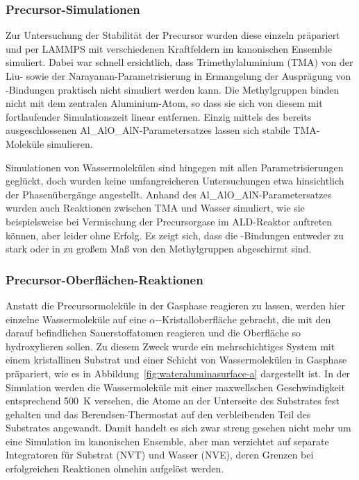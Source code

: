 \subsubsection{Precursor-Simulationen}

Zur Untersuchung der Stabilität der Precursor wurden diese einzeln präpariert und per LAMMPS mit verschiedenen Kraftfeldern im kanonischen Ensemble simuliert.
Dabei war schnell ersichtlich, dass Trimethylaluminium (TMA) von der Liu- sowie der Narayanan-Parametrisierung in Ermangelung der Ausprägung von -Bindungen praktisch nicht simuliert werden kann.
Die Methylgruppen binden nicht mit dem zentralen Aluminium-Atom, so dass sie sich von diesem mit fortlaufender Simulationszeit linear entfernen.
Einzig mittels des bereits ausgeschlossenen Al\_AlO\_AlN-Parametersatzes lassen sich stabile TMA-Moleküle simulieren.


Simulationen von Wassermolekülen sind hingegen mit allen Parametrisierungen geglückt, doch wurden keine umfangreicheren Untersuchungen etwa hinsichtlich der Phasenübergänge angestellt.
Anhand des Al\_AlO\_AlN-Parametersatzes wurden auch Reaktionen zwischen TMA und Wasser simuliert, wie sie beispielsweise bei Vermischung der Precursorgase im ALD-Reaktor auftreten können, aber leider ohne Erfolg.
Es zeigt sich, dass die -Bindungen entweder zu stark oder in zu großem Maß von den Methylgruppen abgeschirmt sind.

\subsubsection{Precursor-Oberflächen-Reaktionen}

Anstatt die Precursormoleküle in der Gasphase reagieren zu lassen, werden hier einzelne Wassermoleküle auf eine $\alpha$--Kristalloberfläche gebracht, die mit den darauf befindlichen Sauerstoffatomen reagieren und die Oberfläche so hydroxylieren sollen.
Zu diesem Zweck wurde ein mehrschichtiges System mit einem kristallinen Substrat und einer Schicht von Wassermolekülen in Gasphase präpariert, wie es in Abbildung~\ref{fig:wateraluminasurface-a} dargestellt ist.
In der Simulation werden die Wassermoleküle mit einer maxwellschen Geschwindigkeit entsprechend \SI{500}{\kelvin} versehen, die Atome an der Unterseite des Substrates fest gehalten und das Berendsen-Thermostat auf den verbleibenden Teil des Substrates angewandt.
Damit handelt es sich zwar streng gesehen nicht mehr um eine Simulation im kanonischen Ensemble, aber man verzichtet auf separate Integratoren für Substrat (NVT) und Wasser (NVE), deren Grenzen bei erfolgreichen Reaktionen ohnehin aufgelöst werden.

